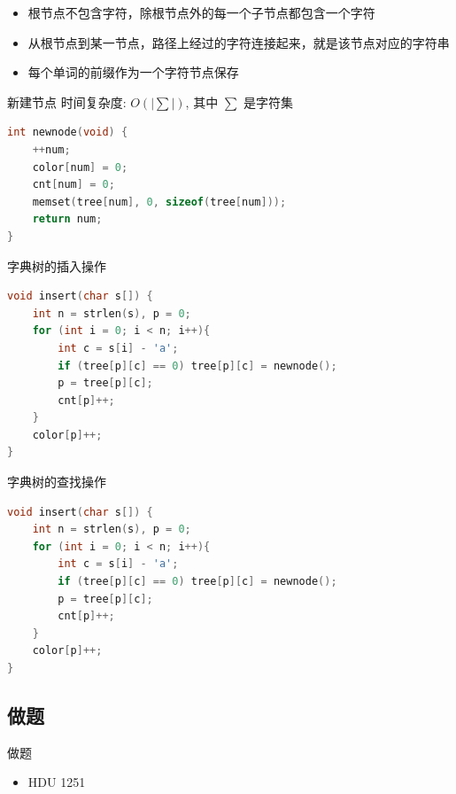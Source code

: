 \begin{frame}
\begin{itemize}
    \item 根节点不包含字符，除根节点外的每一个子节点都包含一个字符
    \item 从根节点到某一节点，路径上经过的字符连接起来，就是该节点对应的字符串
    \item 每个单词的前缀作为一个字符节点保存
\end{itemize}
\end{frame}

\begin{frame}[fragile]{新建节点}
时间复杂度: $O(|\sum|)$, 其中 $\sum$ 是字符集

\begin{lstlisting}[language=C++]
int newnode(void) {
    ++num;
    color[num] = 0;
    cnt[num] = 0;
    memset(tree[num], 0, sizeof(tree[num]));
    return num;
}
\end{lstlisting}
\end{frame}

\begin{frame}[fragile]{字典树的插入操作}
\begin{lstlisting}[language=C++]
void insert(char s[]) {
    int n = strlen(s), p = 0;
    for (int i = 0; i < n; i++){
        int c = s[i] - 'a';
        if (tree[p][c] == 0) tree[p][c] = newnode();
        p = tree[p][c];
        cnt[p]++;
    }
    color[p]++;
}
\end{lstlisting}
\end{frame}

\begin{frame}[fragile]{字典树的查找操作}
\begin{lstlisting}[language=C++]
void insert(char s[]) {
    int n = strlen(s), p = 0;
    for (int i = 0; i < n; i++){
        int c = s[i] - 'a';
        if (tree[p][c] == 0) tree[p][c] = newnode();
        p = tree[p][c];
        cnt[p]++;
    }
    color[p]++;
}
\end{lstlisting}
\end{frame}

\subsection{做题}
\begin{frame}{做题}
\begin{itemize}
    \item HDU 1251
\end{itemize}
\end{frame}


